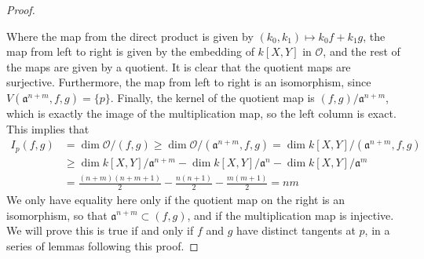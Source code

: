 \begin{proof}
    \begin{center}
    \end{center}
    Where the map from the direct product is given by $(k_0,k_1) \mapsto k_0f + k_1g$, the map from left to right is given by the embedding of $k[X,Y]$ in $\mathcal{O}$, and the rest of the maps are given by a quotient. It is clear that the quotient maps are surjective. Furthermore, the map from left to right is an isomorphism, since $V(\mathfrak{a}^{n+m},f,g) = \{ p \}$. Finally, the kernel of the quotient map is $(f,g)/\mathfrak{a}^{n+m}$, which is exactly the image of the multiplication map, so the left column is exact. This implies that
    \begin{align*}
        I_p(f,g) &= \dim \mathcal{O}/(f,g) \geq \dim \mathcal{O}/(\mathfrak{a}^{n+m},f,g) = \dim k[X,Y]/(\mathfrak{a}^{n+m},f,g)\\
        &\geq \dim k[X,Y]/\mathfrak{a}^{n+m} - \dim k[X,Y]/\mathfrak{a}^n - \dim k[X,Y]/\mathfrak{a}^m\\
        &= \frac{(n+m)(n+m+1)}{2} - \frac{n(n+1)}{2} - \frac{m(m+1)}{2} = nm
    \end{align*}
    We only have equality here only if the quotient map on the right is an isomorphism, so that $\mathfrak{a}^{n+m} \subset (f,g)$, and if the multiplication map is injective. We will prove this is true if and only if $f$ and $g$ have distinct tangents at $p$, in a series of lemmas following this proof.
\end{proof}

